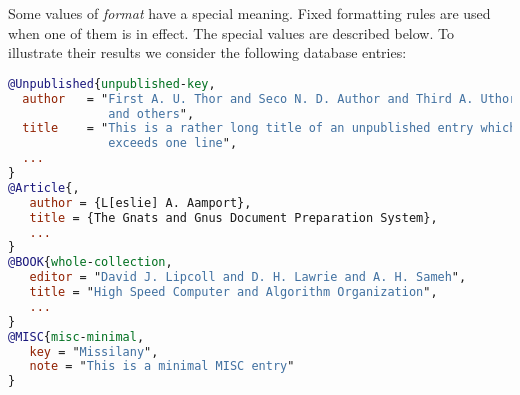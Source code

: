 \documentclass[11pt,a4paper]{scrbook}
\makeatletter
\let\BIBTEX\BibTeX
\renewcommand\BibTeX{\BIBTEX\index{bibtex@\BIBTEX}}
\makeatother
\begin{document}
Some values of \textit{format} have a special meaning. Fixed formatting rules
are used when one of them is in effect. The special values are described
below. To illustrate their results we consider the following \BibTeX{}
database entries:
\begin{lstlisting}[language=BibTeX]
@Unpublished{unpublished-key,
  author   = "First A. U. Thor and Seco N. D. Author and Third A. Uthor
              and others",
  title    = "This is a rather long title of an unpublished entry which
              exceeds one line",
  ...
}
@Article{,
   author = {L[eslie] A. Aamport},
   title = {The Gnats and Gnus Document Preparation System},
   ...
}
@BOOK{whole-collection,
   editor = "David J. Lipcoll and D. H. Lawrie and A. H. Sameh",
   title = "High Speed Computer and Algorithm Organization",
   ...
}
@MISC{misc-minimal,
   key = "Missilany",
   note = "This is a minimal MISC entry"
}
\end{lstlisting}
\end{document}
